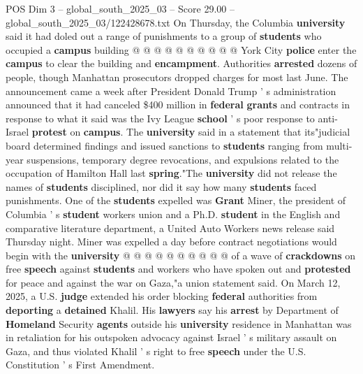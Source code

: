 \begin{textsample}{POS Dim 3 – global\_south\_2025\_03 – Score 29.00 – global\_south\_2025\_03/122428678.txt}
On Thursday, the Columbia \textbf{university} said it had doled out a range of punishments to a group of \textbf{students} who occupied a \textbf{campus} building @ @ @ @ @ @ @ @ @ @ York City \textbf{police} enter the \textbf{campus} to clear the building and \textbf{encampment}.
Authorities \textbf{arrested} dozens of people, though Manhattan prosecutors dropped charges for most last June.
The announcement came a week after President Donald Trump ' s administration announced that it had canceled \$400 million in \textbf{federal} \textbf{grants} and contracts in response to what it said was the Ivy League \textbf{school} ' s poor response to anti-Israel \textbf{protest} on \textbf{campus}.
The \textbf{university} said in a statement that its"judicial board determined findings and issued sanctions to \textbf{students} ranging from multi-year suspensions, temporary degree revocations, and expulsions related to the occupation of Hamilton Hall last \textbf{spring}."The \textbf{university} did not release the names of \textbf{students} disciplined, nor did it say how many \textbf{students} faced punishments.
One of the \textbf{students} expelled was \textbf{Grant} Miner, the president of Columbia ' s \textbf{student} workers union and a Ph.D. \textbf{student} in the English and comparative literature department, a United Auto Workers news release said Thursday night.
Miner was expelled a day before contract negotiations would begin with the \textbf{university} @ @ @ @ @ @ @ @ @ @ of a wave of \textbf{crackdowns} on free \textbf{speech} against \textbf{students} and workers who have spoken out and \textbf{protested} for peace and against the war on Gaza,"a union statement said.
On March 12, 2025, a U.S. \textbf{judge} extended his order blocking \textbf{federal} authorities from \textbf{deporting} a \textbf{detained} Khalil.
His \textbf{lawyers} say his \textbf{arrest} by Department of \textbf{Homeland} Security \textbf{agents} outside his \textbf{university} residence in Manhattan was in retaliation for his outspoken advocacy against Israel ' s military assault on Gaza, and thus violated Khalil ' s right to free \textbf{speech} under the U.S.
Constitution ' s First Amendment.

\end{textsample}
